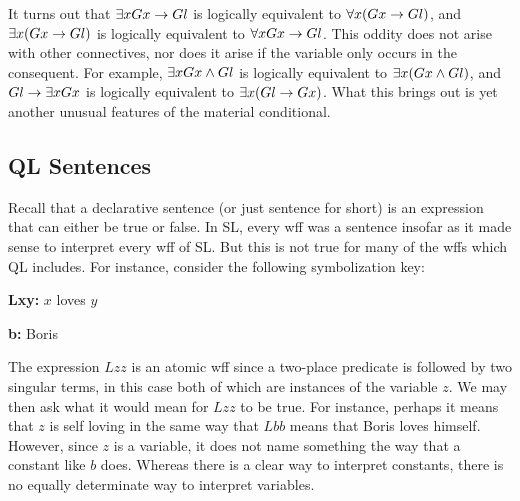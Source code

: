 It turns out that $\exists x Gx \rightarrow Gl$ is logically equivalent to $\forall x (Gx \rightarrow Gl)$, and $\exists x (Gx \rightarrow Gl)$ is logically equivalent to $\forall x Gx \rightarrow Gl$.
This oddity does not arise with other connectives, nor does it arise if the variable only occurs in the consequent.
For example, $\exists x Gx \wedge Gl$ is logically equivalent to $\exists x (Gx \wedge Gl)$, and $Gl \rightarrow \exists x Gx$ is logically equivalent to $\exists x(Gl \rightarrow Gx)$.
What this brings out is yet another unusual features of the material conditional.







\subsection{QL Sentences}

Recall that a declarative sentence (or just sentence for short) is an expression that can either be true or false.
In SL, every wff was a sentence insofar as it made sense to interpret every wff of SL.
But this is not true for many of the wffs which QL includes.
For instance, consider the following symbolization key:

\begin{ekey}
\item[\bf Lxy:] $x$ loves $y$
\item[\bf b:] Boris
\end{ekey}

The expression $Lzz$ is an atomic wff since a two-place predicate is followed by two singular terms, in this case both of which are instances of the variable $z$.
We may then ask what it would mean for $Lzz$ to be true. 
For instance, perhaps it means that $z$ is self loving in the same way that $Lbb$ means that Boris loves himself.
However, since $z$ is a variable, it does not name something the way that a constant like $b$ does.
Whereas there is a clear way to interpret constants, there is no equally determinate way to interpret variables.

